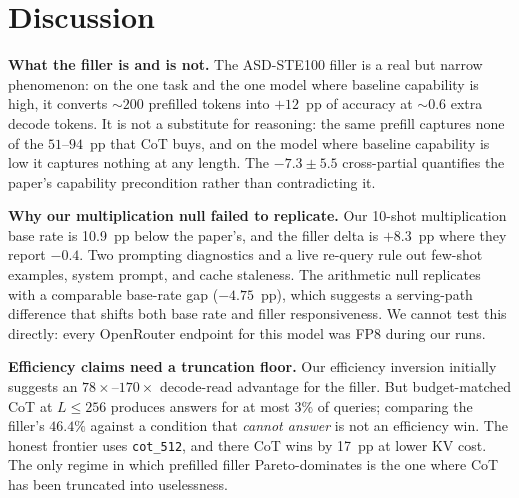 \documentclass[11pt,a4paper]{article}
\begin{document}
\section{Discussion}
\label{sec:discussion}

\textbf{What the filler is and is not.} The ASD-STE100 filler is a real but
narrow phenomenon: on the one task and the one model where baseline capability
is high, it converts ${\sim}200$ prefilled tokens into $+12$~pp of accuracy at
${\sim}0.6$ extra decode tokens. It is not a substitute for reasoning: the same
prefill captures none of the $51$--$94$~pp that CoT buys, and on the model
where baseline capability is low it captures nothing at any length. The
$-7.3 \pm 5.5$ cross-partial quantifies the paper's capability precondition
rather than contradicting it.

\textbf{Why our multiplication null failed to replicate.} Our 10-shot
multiplication base rate is 10.9~pp below the paper's, and the filler delta is
$+8.3$~pp where they report $-0.4$. Two prompting diagnostics and a live
re-query rule out few-shot examples, system prompt, and cache staleness. The
arithmetic null replicates with a comparable base-rate gap ($-4.75$~pp),
which suggests a serving-path difference that shifts both base rate and filler
responsiveness. We cannot test this directly: every OpenRouter endpoint for
this model was FP8 during our runs.

\textbf{Efficiency claims need a truncation floor.} Our efficiency inversion
initially suggests an $78\times$--$170\times$ decode-read advantage for the
filler. But budget-matched CoT at $L \leq 256$ produces answers for at most
$3\%$ of queries; comparing the filler's $46.4\%$ against a condition that
\emph{cannot answer} is not an efficiency win. The honest frontier uses
\texttt{cot\_512}, and there CoT wins by 17~pp at lower KV cost. The only
regime in which prefilled filler Pareto-dominates is the one where CoT has been
truncated into uselessness.
\end{document}
